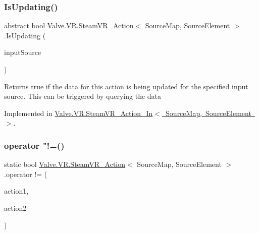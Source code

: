 \mbox{\label{class_valve_1_1_v_r_1_1_steam_v_r___action_ade2f7fe24302b71484c25419fd94271d}} 
\subsubsection{\texorpdfstring{IsUpdating()}{IsUpdating()}}
{\footnotesize\ttfamily abstract bool \mbox{\hyperlink{class_valve_1_1_v_r_1_1_steam_v_r___action}{Valve.\+V\+R.\+Steam\+V\+R\+\_\+\+Action}}$<$ Source\+Map, Source\+Element $>$.Is\+Updating (\begin{DoxyParamCaption}\item[{\mbox{\hyperlink{namespace_valve_1_1_v_r_a82e5bf501cc3aa155444ee3f0662853f}{Steam\+V\+R\+\_\+\+Input\+\_\+\+Sources}}}]{input\+Source }\end{DoxyParamCaption})\hspace{0.3cm}{\ttfamily [pure virtual]}}



Returns true if the data for this action is being updated for the specified input source. This can be triggered by querying the data 



Implemented in \mbox{\hyperlink{class_valve_1_1_v_r_1_1_steam_v_r___action___in_a648d3f94c79e2ec43ec9846535fbf8ef}{Valve.\+V\+R.\+Steam\+V\+R\+\_\+\+Action\+\_\+\+In$<$ Source\+Map, Source\+Element $>$}}.

\mbox{\label{class_valve_1_1_v_r_1_1_steam_v_r___action_ad7b81277f914a527971510f8c1b3f38d}} 
\subsubsection{\texorpdfstring{operator "!=()}{operator !=()}}
{\footnotesize\ttfamily static bool \mbox{\hyperlink{class_valve_1_1_v_r_1_1_steam_v_r___action}{Valve.\+V\+R.\+Steam\+V\+R\+\_\+\+Action}}$<$ Source\+Map, Source\+Element $>$.operator != (\begin{DoxyParamCaption}\item[{\mbox{\hyperlink{class_valve_1_1_v_r_1_1_steam_v_r___action}{Steam\+V\+R\+\_\+\+Action}}$<$ Source\+Map, Source\+Element $>$}]{action1,  }\item[{\mbox{\hyperlink{class_valve_1_1_v_r_1_1_steam_v_r___action}{Steam\+V\+R\+\_\+\+Action}}$<$ Source\+Map, Source\+Element $>$}]{action2 }\end{DoxyParamCaption})\hspace{0.3cm}{\ttfamily [static]}}



